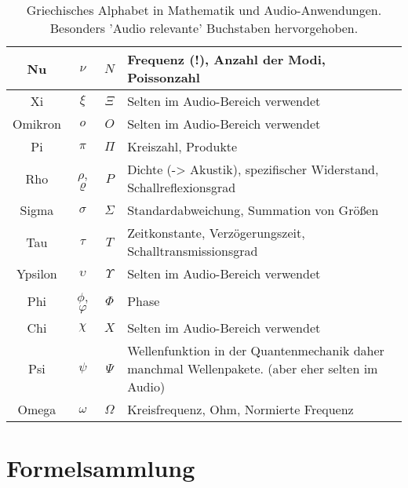\begin{table}[H]
\begin{tabular}{|c|c|c|p{7cm}|}
        \hline
        \rowcolor{tableHighligh}
        Nu      & $\nu$    & $N$ & Frequenz (!), Anzahl der Modi, Poissonzahl \\
        \hline
        Xi      & $\xi$    & $\Xi$ & Selten im Audio-Bereich verwendet \\
        \hline
        Omikron & $o$      & $O$ & Selten im Audio-Bereich verwendet \\
        \hline
        \rowcolor{tableHighligh}
        Pi      & $\pi$    & $\Pi$ & Kreiszahl, Produkte \\
        \hline
        \rowcolor{tableHighligh}
        Rho     & $\rho$, $\varrho$   & $P$ & Dichte (-> Akustik), spezifischer Widerstand,  Schallreflexionsgrad \\
        \hline
        \rowcolor{tableHighligh}
        Sigma   & $\sigma$ & $\Sigma$ & Standardabweichung, Summation von Größen \\
        \hline
        \rowcolor{tableHighligh}
        Tau     & $\tau$   & $T$ & Zeitkonstante, Verzögerungszeit, Schalltransmissionsgrad \\
        \hline
        Ypsilon & $\upsilon$ & $\Upsilon$ & Selten im Audio-Bereich verwendet \\
        \hline
        \rowcolor{tableHighligh}
        Phi     & $\phi$, $\varphi$   & $\Phi$ & Phase \\
        \hline
        Chi     & $\chi$   & $X$ & Selten im Audio-Bereich verwendet \\
        \hline
        Psi     & $\psi$   & $\Psi$ & Wellenfunktion in der Quantenmechanik daher manchmal Wellenpakete. (aber eher selten im Audio) \\
        \hline
        \rowcolor{tableHighligh}
        Omega   & $\omega$ & $\Omega$ & Kreisfrequenz, Ohm, Normierte Frequenz \\
        \hline
    \end{tabular}
    \caption{Griechisches Alphabet in Mathematik und Audio-Anwendungen. Besonders 'Audio relevante' Buchstaben hervorgehoben.}
\end{table}


\section*{Formelsammlung}\label{sec:formelsam}



